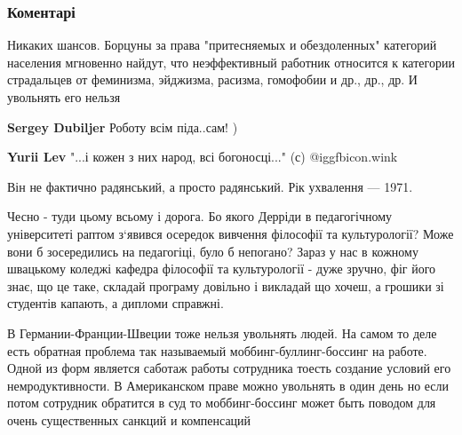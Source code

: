  
 
 
 
 
\subsubsection{Коментарі}
\label{sec:22_07_2021.fb.rudomanov_aleksandr.1.kafedra_bilchenko_vata.cmt}

\begin{itemize} %
Никаких шансов. Борцуны за права "притесняемых и обездоленных" категорий
населения мгновенно найдут, что неэффективный работник относится к категории
страдальцев от феминизма, эйджизма, расизма, гомофобии и др., др., др. И
увольнять его нельзя

\begin{itemize} %
\textbf{Sergey Dubiljer} Роботу всім піда..сам! )

\textbf{Yurii Lev} "...і кожен з них народ, всі богоносці..." (с)  @igg{fbicon.wink} 
\end{itemize} %

Він не фактично радянський, а просто радянський. Рік ухвалення — 1971.


Чесно - туди цьому всьому і дорога. Бо якого Дерріди в педагогічному
університеті раптом з‘явився осередок вивчення філософії та культурології? Може
вони б зосередились на педагогіці, було б непогано? Зараз у нас в кожному
швацькому коледжі кафедра філософії та культурології - дуже зручно, фіг його
знає, що це таке, складай програму довільно і викладай що хочеш, а грошики зі
студентів капають, а дипломи справжні.



В Германии-Франции-Швеции тоже нельзя увольнять людей. На самом то деле есть
обратная проблема так называемый моббинг-буллинг-боссинг на работе. Одной из
форм является саботаж работы сотрудника тоесть создание условий его
немродуктивности. В Американском праве можно увольнять в один день но если
потом сотрудник обратится в суд то моббинг-боссинг может быть поводом для очень
существенных санкций и компенсаций


\end{itemize}
